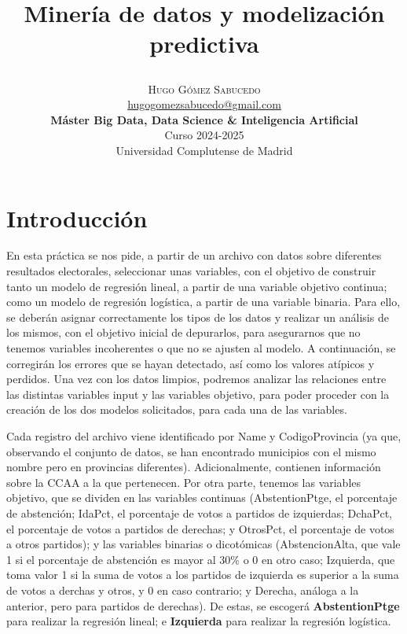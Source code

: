 \documentclass[a4paper,onecolumn]{extarticle}
\title{\begin{center} \Huge Minería de datos y modelización predictiva \end{center}} %
\author{
    \textsc{\Huge Hugo Gómez Sabucedo} \\ %
    \large \href{mailto:hugogomezsabucedo@gmail.com}{hugogomezsabucedo@gmail.com} \\ [2ex] %
    \Large \textbf{Máster Big Data, Data Science \& Inteligencia Artificial} \\
    \normalsize Curso 2024-2025 \\
    \large Universidad Complutense de Madrid
}
\date{} %
\begin{document}
\maketitle
\newpage
\tableofcontents
\newpage
\begin{sloppypar}


\section{Introducción} \label{enunciado}
En esta práctica se nos pide, a partir de un archivo con datos sobre diferentes resultados electorales, seleccionar unas variables, con el objetivo
de construir tanto un modelo de regresión lineal, a partir de una variable objetivo continua; como un modelo de regresión logística, a partir de una
variable binaria. Para ello, se deberán asignar correctamente los tipos de los datos y realizar un análisis de los mismos, con el objetivo inicial 
de depurarlos, para asegurarnos que no tenemos variables incoherentes o que no se ajusten al modelo. A continuación, se corregirán los errores que se 
hayan detectado, así como los valores atípicos y perdidos. Una vez con los datos limpios, podremos analizar las relaciones entre las distintas variables 
input y las variables objetivo, para poder proceder con la creación de los dos modelos solicitados, para cada una de las variables.

Cada registro del archivo viene identificado por Name y CodigoProvincia (ya que, observando el conjunto de datos, se han encontrado municipios con el mismo
nombre pero en provincias diferentes). Adicionalmente, contienen información sobre la CCAA a la que pertenecen. Por otra parte, tenemos las variables objetivo,
que se dividen en las variables continuas (AbstentionPtge, el porcentaje de abstención; IdaPct, el porcentaje de votos a partidos de izquierdas; DchaPct, el
porcentaje de votos a partidos de derechas; y OtrosPct, el porcentaje de votos a otros partidos); y las variables binarias o dicotómicas (AbstencionAlta, que 
vale 1 si el porcentaje de abstención es mayor al 30\% o 0 en otro caso; Izquierda, que toma valor 1 si la suma de votos a los partidos de izquierda es 
superior a la suma de votos a derchas y otros, y 0 en caso contrario; y Derecha, análoga a la anterior, pero para partidos de derechas). De estas, se
escogerá \textbf{AbstentionPtge} para realizar la regresión lineal; e \textbf{Izquierda} para realizar la regresión logística.


\end{sloppypar}
\end{document}
